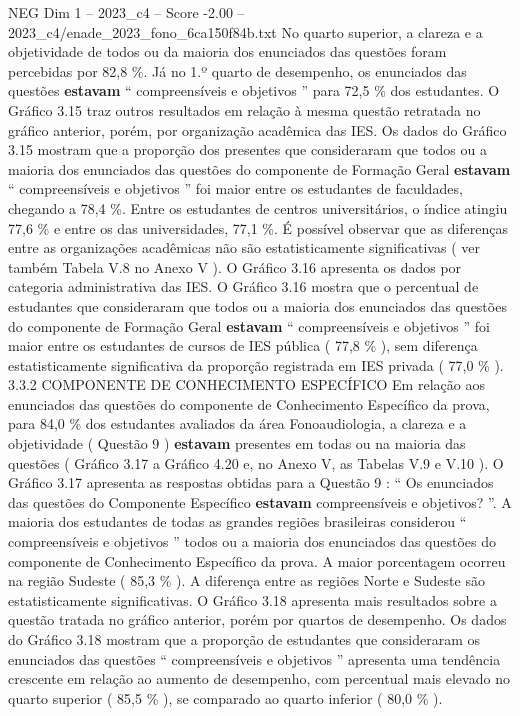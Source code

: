 \begin{textsample}{NEG Dim 1 – 2023\_c4 – Score -2.00 – 2023\_c4/enade\_2023\_fono\_6ca150f84b.txt}
No quarto superior, a clareza e a objetividade de todos ou da maioria dos enunciados das questões foram percebidas por 82,8 \%.
Já no 1.º quarto de desempenho, os enunciados das questões \textbf{estavam} “ compreensíveis e objetivos ” para 72,5 \% dos estudantes.
O Gráfico 3.15 traz outros resultados em relação à mesma questão retratada no gráfico anterior, porém, por organização acadêmica das IES.
Os dados do Gráfico 3.15 mostram que a proporção dos presentes que consideraram que todos ou a maioria dos enunciados das questões do componente de Formação Geral \textbf{estavam} “ compreensíveis e objetivos ” foi maior entre os estudantes de faculdades, chegando a 78,4 \%.
Entre os estudantes de centros universitários, o índice atingiu 77,6 \% e entre os das universidades, 77,1 \%.
É possível observar que as diferenças entre as organizações acadêmicas não são estatisticamente significativas ( ver também Tabela V.8 no Anexo V ).
O Gráfico 3.16 apresenta os dados por categoria administrativa das IES.
O Gráfico 3.16 mostra que o percentual de estudantes que consideraram que todos ou a maioria dos enunciados das questões do componente de Formação Geral \textbf{estavam} “ compreensíveis e objetivos ” foi maior entre os estudantes de cursos de IES pública ( 77,8 \% ), sem diferença estatisticamente significativa da proporção registrada em IES privada ( 77,0 \% ). 3.3.2 COMPONENTE DE CONHECIMENTO ESPECÍFICO Em relação aos enunciados das questões do componente de Conhecimento Específico da prova, para 84,0 \% dos estudantes avaliados da área Fonoaudiologia, a clareza e a objetividade ( Questão 9 ) \textbf{estavam} presentes em todas ou na maioria das questões ( Gráfico 3.17 a Gráfico 4.20 e, no Anexo V, as Tabelas V.9 e V.10 ).
O Gráfico 3.17 apresenta as respostas obtidas para a Questão 9 : “ Os enunciados das questões do Componente Específico \textbf{estavam} compreensíveis e objetivos? ”.
A maioria dos estudantes de todas as grandes regiões brasileiras considerou “ compreensíveis e objetivos ” todos ou a maioria dos enunciados das questões do componente de Conhecimento Específico da prova.
A maior porcentagem ocorreu na região Sudeste ( 85,3 \% ).
A diferença entre as regiões Norte e Sudeste são estatisticamente significativas.
O Gráfico 3.18 apresenta mais resultados sobre a questão tratada no gráfico anterior, porém por quartos de desempenho.
Os dados do Gráfico 3.18 mostram que a proporção de estudantes que consideraram os enunciados das questões “ compreensíveis e objetivos ” apresenta uma tendência crescente em relação ao aumento de desempenho, com percentual mais elevado no quarto superior ( 85,5 \% ), se comparado ao quarto inferior ( 80,0 \% ).

\end{textsample}
